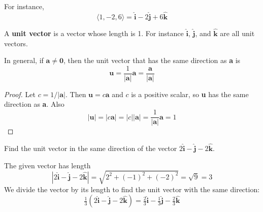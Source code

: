     \begin{example}
      For instance,
      $$ \langle 1,-2,6 \rangle = \mathbf{\hat{i}} - 2\mathbf{\hat{j}} + 6\mathbf{\hat{k}} $$
    \end{example}
    A \textbf{unit vector} is a vector whose length is 1. For instance  $\mathbf{\hat{i}}$, $\mathbf{\hat{j}}$, and $\mathbf{\hat{k}}$ are all unit vectors.
    \begin{definition}
      In general, if $\mathbf{a \neq 0}$, then the unit vector that has the same direction as \textbf{a} is
      $$ \mathbf{u}= \frac{1}{|\mathbf{a}|}\mathbf{a} = \frac{\mathbf{a}}{|\mathbf{a}|} $$
    \end{definition}
    \begin{proof}\let\qed\relax
      Let $c=1/|\mathbf{a}|$. Then $\mathbf{u}=c \mathbf{a}$ and $c$ is a positive scalar, so \textbf{u} has the same direction as \textbf{a}. Also
      $$ |\mathbf{u}| = |c\mathbf{a}| = |c||\mathbf{a}| = \frac{1}{|\mathbf{a}|}\mathbf{a} = 1 $$
    \end{proof}
    \begin{example}
      Find the unit vector in the same direction of the vector $2\mathbf{\hat{i}} - \mathbf{\hat{j}} - 2\mathbf{\hat{k}}$.
    \end{example}
    \begin{solution}
      The given vector has length
      $$ |2\mathbf{\hat{i}} - \mathbf{\hat{j}} - 2\mathbf{\hat{k}}| = \sqrt{2^2 + (-1)^2 + (-2)^2} = \sqrt{9}=3$$
      We divide the vector by its length to find the unit vector with the same direction:
      $$ \tfrac{1}{3} (2\mathbf{\hat{i}} - \mathbf{\hat{j}} - 2\mathbf{\hat{k}}) = \tfrac{2}{3}\mathbf{\hat{i}} - \tfrac{1}{3}\mathbf{\hat{j}} - \tfrac{2}{3}\mathbf{\hat{k}} $$
    \end{solution}